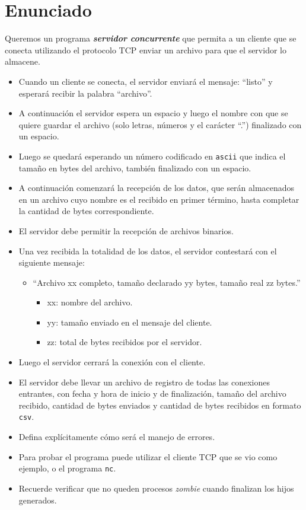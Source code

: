 \section{Enunciado}
Queremos un programa \textbf{\textit{servidor concurrente}} que permita a un cliente que se conecta utilizando el protocolo TCP enviar un archivo para que el servidor lo almacene.\\

\begin{itemize}
    \item Cuando un cliente se conecta, el servidor enviará el mensaje: ``listo'' y esperará recibir la palabra ``archivo''.
    \item A continuación el servidor espera un espacio y luego el nombre con que se quiere guardar el archivo (solo letras, números y el carácter ``.'') finalizado con un espacio.
    \item Luego se quedará esperando un número codificado en \texttt{ascii} que indica el tamaño en bytes del archivo, también finalizado con un espacio.
    \item A continuación comenzará la recepción de los datos, que serán almacenados en un archivo cuyo nombre es el recibido en primer término, hasta completar la cantidad de bytes correspondiente.
    \item El servidor debe permitir la recepción de archivos binarios.
    \item Una vez recibida la totalidad de los datos, el servidor contestará con el siguiente mensaje:
    \begin{itemize}
        \item ``Archivo xx completo, tamaño declarado yy bytes, tamaño real zz bytes.''
        \begin{itemize}
            \item xx: nombre del archivo.
            \item yy: tamaño enviado en el mensaje del cliente.
            \item zz: total de bytes recibidos por el servidor.
        \end{itemize}
    \end{itemize}
    \item Luego el servidor cerrará la conexión con el cliente.
    \item El servidor debe llevar un archivo de registro de todas las conexiones entrantes, con fecha y hora de inicio y de finalización, tamaño del archivo recibido, cantidad de bytes enviados y cantidad de bytes recibidos en formato \texttt{csv}.
    \item Defina explícitamente cómo será el manejo de errores.
    \item Para probar el programa puede utilizar el cliente TCP que se vio como ejemplo, o el programa \texttt{nc}.
    \item Recuerde verificar que no queden procesos \textit{zombie} cuando finalizan los hijos generados.
\end{itemize}
